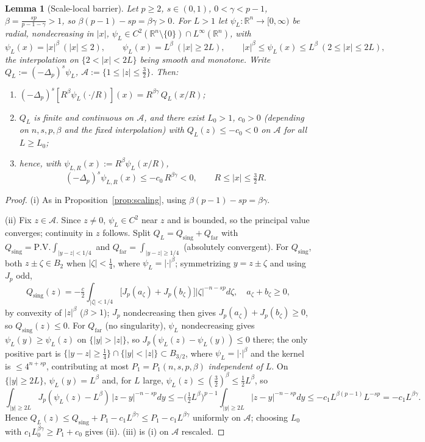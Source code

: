\documentclass[11pt]{amsart}
\theoremstyle{plain}
\newtheorem{lemma}[theorem]{Lemma}
\theoremstyle{definition}
\theoremstyle{remark}
\newcommand{\R}{\mathbb{R}}
\newcommand{\fpl}[1]{(-\Delta_p)^{s}#1}
\begin{document}
\begin{lemma}[Scale-local barrier]\label{lem:barrier}
Let $p\ge2$, $s\in(0,1)$, $0<\gamma<p-1$, $\beta=\frac{sp}{p-1-\gamma}>1$, so
$\beta(p-1)-sp=\beta\gamma>0$. For $L>1$ let $\psi_L:\R^n\to[0,\infty)$ be radial,
nondecreasing in $|x|$, $\psi_L\in C^2(\R^n\setminus\{0\})\cap L^\infty(\R^n)$,
with
\[
  \psi_L(x)=|x|^{\beta}\ (|x|\le2),\qquad \psi_L(x)=L^{\beta}\ (|x|\ge2L),\qquad
  |x|^{\beta}\le\psi_L(x)\le L^{\beta}\ (2\le|x|\le2L),
\]
the interpolation on $\{2<|x|<2L\}$ being smooth and monotone. Write
$Q_L:=\fpl{\psi_L}$, $\mathcal A:=\{1\le|z|\le\tfrac32\}$. Then:
\begin{enumerate}[leftmargin=2.2em]
\item[\textnormal{(i)}] $\fpl{[R^{\beta}\psi_L(\cdot/R)]}(x)=R^{\beta\gamma}\,
  Q_L(x/R)$;
\item[\textnormal{(ii)}] $Q_L$ is finite and continuous on $\mathcal A$, and there
  exist $L_0>1$, $c_0>0$ (depending on $n,s,p,\beta$ and the fixed interpolation)
  with $Q_L(z)\le -c_0<0$ on $\mathcal A$ for all $L\ge L_0$;
\item[\textnormal{(iii)}] hence, with $\psi_{L,R}(x):=R^{\beta}\psi_L(x/R)$,
  \[
    \fpl{\psi_{L,R}}(x)\le -c_0\,R^{\beta\gamma}<0,\qquad R\le|x|\le\tfrac32R .
  \]
\end{enumerate}
\end{lemma}
\begin{proof}
(i) As in Proposition~\ref{prop:scaling}, using $\beta(p-1)-sp=\beta\gamma$.

(ii) Fix $z\in\mathcal A$. Since $z\ne0$, $\psi_L\in C^2$ near $z$ and is
bounded, so the principal value converges; continuity in $z$ follows. Split
$Q_L=Q_{\mathrm{sing}}+Q_{\mathrm{far}}$ with $Q_{\mathrm{sing}}=
\mathrm{P.V.}\!\int_{|y-z|<1/4}$ and $Q_{\mathrm{far}}=\int_{|y-z|\ge1/4}$
(absolutely convergent). For $Q_{\mathrm{sing}}$, both $z\pm\zeta\in B_2$ when
$|\zeta|<\tfrac14$, where $\psi_L=|\cdot|^{\beta}$; symmetrizing
$y=z\pm\zeta$ and using $J_p$ odd,
\[
  Q_{\mathrm{sing}}(z)=-\tfrac{c}{2}\!\int_{|\zeta|<1/4}\!\big[J_p(a_\zeta)+
   J_p(b_\zeta)\big]|\zeta|^{-n-sp}d\zeta,\quad a_\zeta+b_\zeta\ge0,
\]
by convexity of $|z|^{\beta}$ ($\beta>1$); $J_p$ nondecreasing then gives
$J_p(a_\zeta)+J_p(b_\zeta)\ge0$, so $Q_{\mathrm{sing}}(z)\le0$. For
$Q_{\mathrm{far}}$ (no singularity), $\psi_L$ nondecreasing gives
$\psi_L(y)\ge\psi_L(z)$ on $\{|y|>|z|\}$, so $J_p(\psi_L(z)-\psi_L(y))\le0$
there; the only positive part is $\{|y-z|\ge\tfrac14\}\cap\{|y|<|z|\}\subset
B_{3/2}$, where $\psi_L=|\cdot|^{\beta}$ and the kernel is $\le 4^{n+sp}$,
contributing at most $P_1=P_1(n,s,p,\beta)$ \emph{independent of $L$}. On
$\{|y|\ge2L\}$, $\psi_L(y)=L^{\beta}$ and, for $L$ large,
$\psi_L(z)\le(\tfrac32)^{\beta}\le\tfrac12L^{\beta}$, so
\[
  \int_{|y|\ge2L}\!J_p(\psi_L(z)-L^{\beta})\,|z-y|^{-n-sp}dy
  \le -\big(\tfrac12L^{\beta}\big)^{p-1}\!\!\int_{|y|\ge2L}\!|z-y|^{-n-sp}dy
  \le -c_1L^{\beta(p-1)}L^{-sp}=-c_1L^{\beta\gamma}.
\]
Hence $Q_L(z)\le Q_{\mathrm{sing}}+P_1-c_1L^{\beta\gamma}\le P_1-c_1
L^{\beta\gamma}$ uniformly on $\mathcal A$; choosing $L_0$ with $c_1L_0^{\beta
\gamma}\ge P_1+c_0$ gives (ii). (iii) is (i) on $\mathcal A$ rescaled.
\end{proof}
\end{document}
